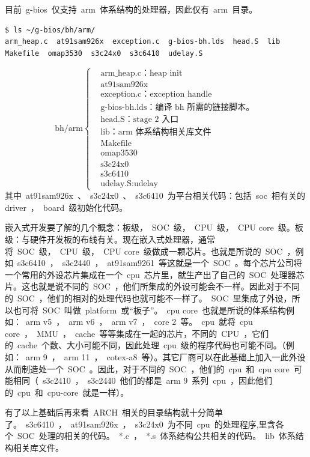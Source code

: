 \documentclass[a4paper,11pt]{book}
\begin{document}
\begin{CJK*}{UTF8}{gbsn}
目前~g-bios~仅支持~arm~体系结构的处理器，因此仅有~arm~目录。
\begin{lstlisting}[language={SH},numbers=none]
$ ls ~/g-bios/bh/arm/
arm_heap.c  at91sam926x  exception.c  g-bios-bh.lds  head.S  lib  Makefile  omap3530  s3c24x0  s3c6410  udelay.S
\end{lstlisting}

\begin{equation*}
\text{bh/arm}
\left\{
	\begin{aligned}
	&\text{arm\_heap.c：heap init} \\
	&\text{at91sam926x} \\
	&\text{exception.c：exception handle} \\
	&\text{g-bios-bh.lds：编译~bh~所需的链接脚本。} \\
	&\text{head.S：stage 2~入口} \\
	&\text{lib：arm~体系结构相关库文件} \\
	&\text{Makefile}\\
	&\text{omap3530}\\
	&\text{s3c24x0}\\
	&\text{s3c6410}\\
	&\text{udelay.S:udelay}
	\end{aligned}
\right.
\end{equation*}
其中~at91sam926x~、~s3c24x0~、~s3c6410~为平台相关代码：包括~soc~相有关的driver~，~board~级初始化代码。

嵌入式开发要了解的几个概念：板级，~SOC~级，~CPU~级，~CPU core~级。板级：与硬件开发板的布线有关。现在嵌入式处理器，通常将~SOC~级，~CPU~级，~CPU core~级做成一颗芯片。也就是所说的~SOC~，例如~s3c6410~，~s3c2440~，~at91sam9261~等这就是一个~SOC~。每个芯片公司将一个常用的外设芯片集成在一个~cpu~芯片里，就生产出了自己的~SOC~处理器芯片。这也就是说不同的~SOC~，他们所集成的外设可能会不一样。因此对于不同的~SOC~，他们的相对的处理代码也就可能不一样了。~SOC~里集成了外设，所以也可将~SOC~叫做~platform~或``板子''。~cpu core~也就是所说的体系结构例如：~arm v5~，~arm v6~，~arm v7~，~core 2~等。~cpu~就将~cpu core~，~MMU~，~cache~等等集成在一起的芯片，不同的~CPU~，它们的~cache~个数、大小可能不同，因此处理~cpu~级的程序代码也可能不同。（例如：~arm 9~，~arm 11~，~cotex-a8~等）。其它厂商可以在此基础上加入一此外设从而制造处一个~SOC~。因此，对于不同的~SOC~，他们的~cpu~和~cpu core~可能相同（~s3c2410~，~s3c2440~他们的都是~arm 9~系列~cpu~，因此他们的~cpu~和~cpu-core~就是一样）。

有了以上基础后再来看~ARCH~相关的目录结构就十分简单了。~s3c6410~，~at91sam926x~，~s3c24x0~为不同~cpu~的处理程序,里含各个~SOC~处理的相关的代码。~*.c~，~*.s~体系结构公共相关的代码。~lib~体系结构相关库文件。


\end{CJK*}
\end{document}
